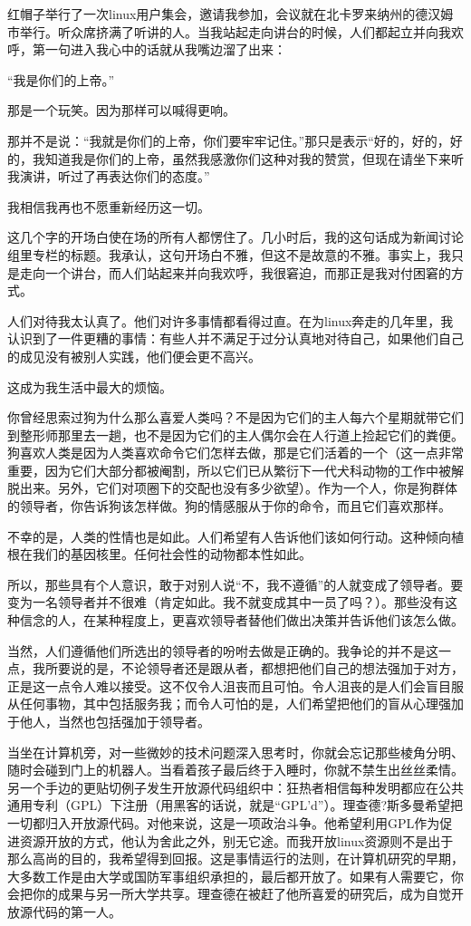 红帽子举行了一次linux用户集会，邀请我参加，会议就在北卡罗来纳州的德汉姆市举行。听众席挤满了听讲的人。当我站起走向讲台的时候，人们都起立并向我欢呼，第一句进入我心中的话就从我嘴边溜了出来：

“我是你们的上帝。”

那是一个玩笑。因为那样可以喊得更响。

那并不是说：“我就是你们的上帝，你们要牢牢记住。”那只是表示“好的，好的，好的，我知道我是你们的上帝，虽然我感激你们这种对我的赞赏，但现在请坐下来听我演讲，听过了再表达你们的态度。”

我相信我再也不愿重新经历这一切。

这几个字的开场白使在场的所有人都愣住了。几小时后，我的这句话成为新闻讨论组里专栏的标题。我承认，这句开场白不雅，但这不是故意的不雅。事实上，我只是走向一个讲台，而人们站起来并向我欢呼，我很窘迫，而那正是我对付困窘的方式。

人们对待我太认真了。他们对许多事情都看得过直。在为linux奔走的几年里，我认识到了一件更糟的事情：有些人并不满足于过分认真地对待自己，如果他们自己的成见没有被别人实践，他们便会更不高兴。

这成为我生活中最大的烦恼。

你曾经思索过狗为什么那么喜爱人类吗？不是因为它们的主人每六个星期就带它们到整形师那里去一趟，也不是因为它们的主人偶尔会在人行道上捡起它们的粪便。狗喜欢人类是因为人类喜欢命令它们怎样去做，那是它们活着的一个（这一点非常重要，因为它们大部分都被阉割，所以它们已从繁衍下一代犬科动物的工作中被解脱出来。另外，它们对项圈下的交配也没有多少欲望）。作为一个人，你是狗群体的领导者，你告诉狗该怎样做。狗的情感服从于你的命令，而且它们喜欢那样。

不幸的是，人类的性情也是如此。人们希望有人告诉他们该如何行动。这种倾向植根在我们的基因核里。任何社会性的动物都本性如此。

所以，那些具有个人意识，敢于对别人说“不，我不遵循”的人就变成了领导者。要变为一名领导者并不很难（肯定如此。我不就变成其中一员了吗？）。那些没有这种信念的人，在某种程度上，更喜欢领导者替他们做出决策并告诉他们该怎么做。

当然，人们遵循他们所选出的领导者的吩咐去做是正确的。我争论的并不是这一点，我所要说的是，不论领导者还是跟从者，都想把他们自己的想法强加于对方，正是这一点令人难以接受。这不仅令人沮丧而且可怕。令人沮丧的是人们会盲目服从任何事物，其中包括服务我；而令人可怕的是，人们希望把他们的盲从心理强加于他人，当然也包括强加于领导者。

当坐在计算机旁，对一些微妙的技术问题深入思考时，你就会忘记那些棱角分明、随时会碰到门上的机器人。当看着孩子最后终于入睡时，你就不禁生出丝丝柔情。另一个手边的更贴切例子发生开放源代码组织中：狂热者相信每种发明都应在公共通用专利（GPL）下注册（用黑客的话说，就是“GPL’d”）。理查德?斯多曼希望把一切都归入开放源代码。对他来说，这是一项政治斗争。他希望利用GPL作为促进资源开放的方式，他认为舍此之外，别无它途。而我开放linux资源则不是出于那么高尚的目的，我希望得到回报。这是事情运行的法则，在计算机研究的早期，大多数工作是由大学或国防军事组织承担的，最后都开放了。如果有人需要它，你会把你的成果与另一所大学共享。理查德在被赶了他所喜爱的研究后，成为自觉开放源代码的第一人。

